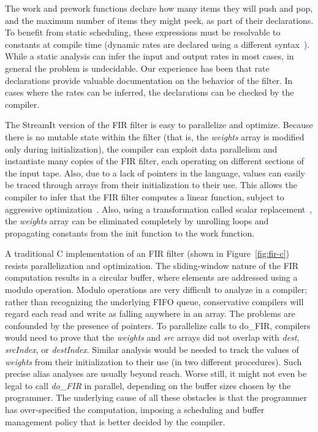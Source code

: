 The work and prework functions declare how many items they will push
and pop, and the maximum number of items they might peek, as part of
their declarations.  To benefit from static scheduling, these
expressions must be resolvable to constants at compile time (dynamic
rates are declared using a different
syntax~\cite{streamit-lang-spec}). While a static analysis can infer
the input and output rates in most cases, in general the problem is
undecidable.  Our experience has been that rate declarations provide
valuable documentation on the behavior of the filter.  In cases where
the rates can be inferred, the declarations can be checked by the
compiler.

The StreamIt version of the FIR filter is easy to parallelize and
optimize.  Because there is no mutable state within the filter (that
is, the {\it weights} array is modified only during initialization),
the compiler can exploit data parallelism and instantiate many copies
of the FIR filter, each operating on different sections of the input
tape.
Also, due to a lack of pointers in the language, values can easily be
traced through arrays from their initialization to their use.  This
allows the compiler to infer that the FIR filter computes a linear
function, subject to aggressive optimization~\cite{lamb-pldi03}.
Also, using a transformation called scalar
replacement~\cite{sermulins-lctes05}, the {\it weights} array can be
eliminated completely by unrolling loops and propagating constants
from the init function to the work function.

A traditional C implementation of an FIR filter (shown in
Figure~\ref{fig:fir-c}) resists parallelization and optimization.  The
sliding-window nature of the FIR computation results in a circular
buffer, where elements are addressed using a modulo operation.  Modulo
operations are very difficult to analyze in a compiler; rather than
recognizing the underlying FIFO queue, conservative compilers will
regard each read and write as falling anywhere in an array.  The
problems are confounded by the presence of pointers.  To parallelize
calls to do\_FIR, compilers would need to prove that the {\it weights}
and {\it src} arrays did not overlap with {\it dest}, {\it srcIndex},
or {\it destIndex}.  Similar analysis would be needed to track the
values of {\it weights} from their initialization to their use (in two
different procedures).  Such precise alias analyses are usually beyond
reach.  Worse still, it might not even be legal to call {\it do\_FIR}
in parallel, depending on the buffer sizes chosen by the programmer.
The underlying cause of all these obstacles is that the programmer has
over-specified the computation, imposing a scheduling and buffer
management policy that is better decided by the compiler.

